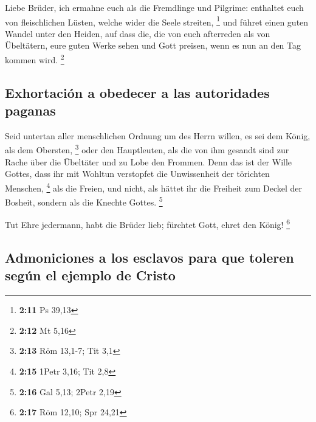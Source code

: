  Liebe Brüder, ich ermahne euch als die Fremdlinge und
Pilgrime: enthaltet euch von fleischlichen Lüsten, welche wider die
Seele streiten, \footnote{\textbf{2:11} Ps 39,13}  und
führet einen guten Wandel unter den Heiden, auf dass die, die von euch
afterreden als von Übeltätern, eure guten Werke sehen und Gott preisen,
wenn es nun an den Tag kommen wird. \footnote{\textbf{2:12} Mt 5,16}

\hypertarget{exhortaciuxf3n-a-obedecer-a-las-autoridades-paganas}{%
\subsection{Exhortación a obedecer a las autoridades
paganas}\label{exhortaciuxf3n-a-obedecer-a-las-autoridades-paganas}}

 Seid untertan aller menschlichen Ordnung um des Herrn
willen, es sei dem König, als dem Obersten, \footnote{\textbf{2:13} Röm
  13,1-7; Tit 3,1}  oder den Hauptleuten, als die von ihm
gesandt sind zur Rache über die Übeltäter und zu Lobe den Frommen.
 Denn das ist der Wille Gottes, dass ihr mit Wohltun
verstopfet die Unwissenheit der törichten Menschen, \footnote{\textbf{2:15}
  1Petr 3,16; Tit 2,8}  als die Freien, und nicht, als
hättet ihr die Freiheit zum Deckel der Bosheit, sondern als die Knechte
Gottes. \footnote{\textbf{2:16} Gal 5,13; 2Petr 2,19}

 Tut Ehre jedermann, habt die Brüder lieb; fürchtet Gott,
ehret den König! \footnote{\textbf{2:17} Röm 12,10; Spr 24,21}

\hypertarget{admoniciones-a-los-esclavos-para-que-toleren-seguxfan-el-ejemplo-de-cristo}{%
\subsection{Admoniciones a los esclavos para que toleren según el
ejemplo de
Cristo}\label{admoniciones-a-los-esclavos-para-que-toleren-seguxfan-el-ejemplo-de-cristo}}

